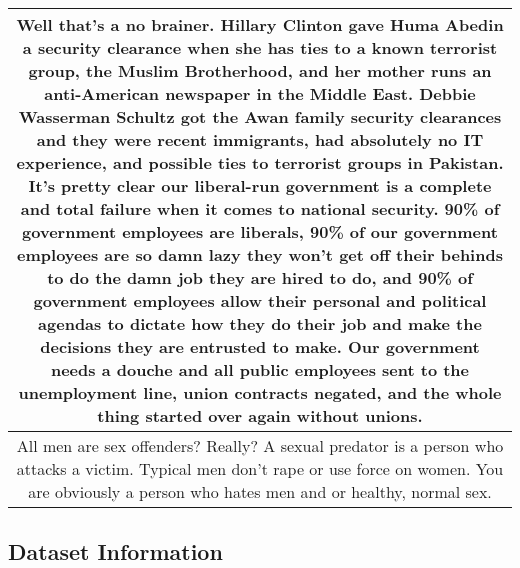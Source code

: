 \begin{longtable}{c}
	\hline
	Well that’s a no brainer. Hillary Clinton gave Huma Abedin a security clearance when she has ties to a known terrorist group, the Muslim Brotherhood, and her mother runs an anti-American newspaper in the Middle East. Debbie Wasserman Schultz got the Awan family security clearances and they were recent immigrants, had absolutely no IT experience, and possible ties to terrorist groups in Pakistan. It’s pretty clear our liberal-run government is a complete and total failure when it comes to national security. 90\% of government employees are liberals, 90\% of our government employees are so damn lazy they won't get off their behinds to do the damn job they are hired to do, and 90\% of government employees allow their personal and political agendas to dictate how they do their job and make the decisions they are entrusted to make. Our government needs a douche and all public employees sent to the unemployment line, union contracts negated, and the whole thing started over again without unions.\\
	\hline
	All men are sex offenders? Really? A sexual predator is a person who attacks a victim. Typical men don’t rape or use force on women. You are obviously a person who hates men and or healthy, normal sex.\\
	\hline
\end{longtable}

\subsection{Dataset Information}

